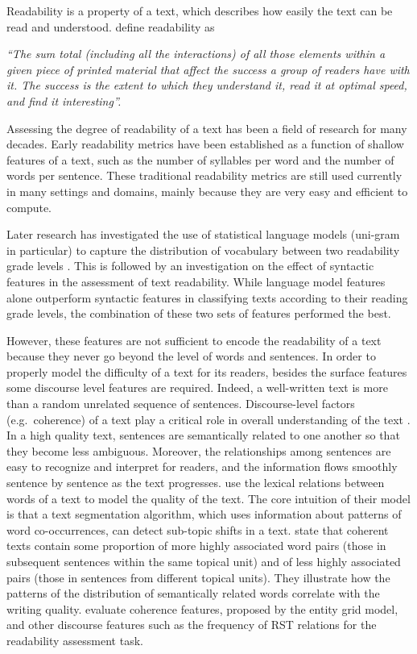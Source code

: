 Readability is a property of a text, which describes how easily the text can be read and understood.  
 define readability as 

\emph{``The sum total (including all the interactions) of all those elements within a given piece of printed material that affect the success a group of readers have with it. 
The success is the extent to which they understand it, read it at optimal speed, and find it interesting''.}

Assessing the degree of readability of a text has been a field of research for many decades. 
Early readability metrics \cite{flesch48,kincaid75} have been established as a function of shallow features of a text, such as the number of syllables per word and the number of words per sentence. 
These traditional readability metrics are still used currently in many settings and domains, mainly because they are very easy and efficient to compute.  

Later research has investigated the use of statistical language models 
(uni-gram in particular) to capture the distribution of vocabulary between two readability grade levels
\cite{siluo01,collins-thompson04}. 
This is followed by an investigation on the effect of syntactic features \cite{schwarm05,heilman07,petersen09} in the assessment of text readability. 
While language model features alone outperform syntactic features in classifying texts according to their reading grade levels, the combination of these two sets of features performed the best. 

However, these features are not sufficient to encode the readability of a text because they never go beyond the level of words and sentences. 
In order to properly model the difficulty of a text for its readers, besides the surface features some discourse level features  are required. 
Indeed, a well-written text is more than a random unrelated sequence of sentences. 
Discourse-level factors (e.g.\ coherence) of a text play a critical role in overall understanding of the text \cite{pitler08}.  
In a high quality text, sentences are semantically related to one another so that they become less ambiguous.   
Moreover, the relationships among sentences are easy to recognize and interpret for readers, and the information flows smoothly  sentence by sentence as the text progresses. 
 use the lexical relations between words of a text to model the quality of the text. 
The core intuition of their model is that a text segmentation algorithm, which uses information about patterns of word co-occurrences, can detect sub-topic shifts in a text. 
 state that coherent texts contain some proportion of more highly associated word pairs (those in subsequent sentences within the same topical unit) and of less highly associated pairs (those in sentences from different topical units).  
They illustrate how the patterns of the distribution of semantically related words correlate with the writing quality. 
 evaluate coherence features, proposed by the entity grid model, and other discourse features such as the frequency of RST relations for the readability assessment task.  

